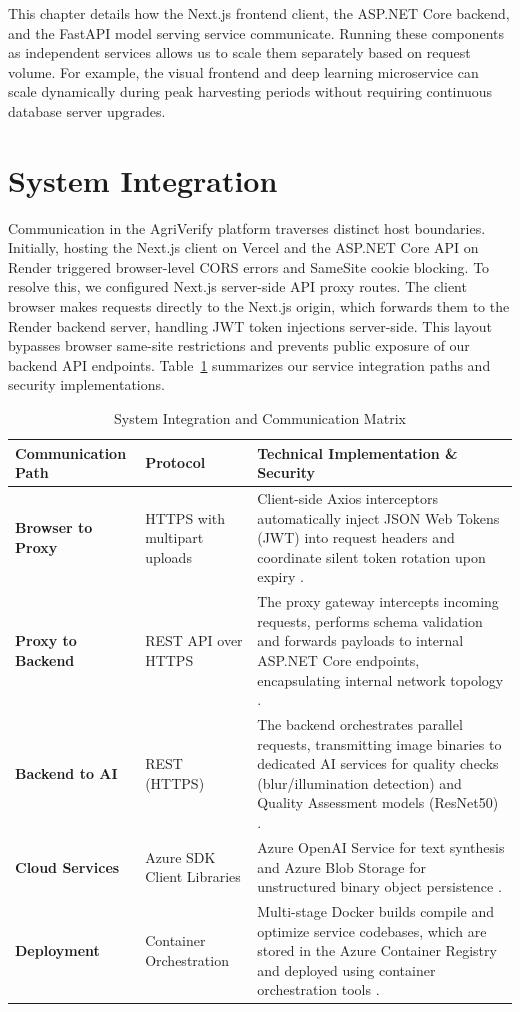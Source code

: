 This chapter details how the Next.js frontend client, the ASP.NET Core backend, and the FastAPI model serving service communicate. Running these components as independent services allows us to scale them separately based on request volume. For example, the visual frontend and deep learning microservice can scale dynamically during peak harvesting periods without requiring continuous database server upgrades.

\section{System Integration}

Communication in the AgriVerify platform traverses distinct host boundaries. Initially, hosting the Next.js client on Vercel and the ASP.NET Core API on Render triggered browser-level CORS errors and SameSite cookie blocking. To resolve this, we configured Next.js server-side API proxy routes. The client browser makes requests directly to the Next.js origin, which forwards them to the Render backend server, handling JWT token injections server-side. This layout bypasses browser same-site restrictions and prevents public exposure of our backend API endpoints. Table~\ref{tab:integration_matrix} summarizes our service integration paths and security implementations.

\begin{table}[htbp]
\centering
\caption{System Integration and Communication Matrix}
\label{tab:integration_matrix}
\small
\renewcommand{\arraystretch}{1.1}
\begin{tabularx}{\textwidth}{|p{3.5cm}|p{3.5cm}|X|}
\hline
\textbf{Communication Path} & \textbf{Protocol} & \textbf{Technical Implementation \& Security} \\
\hline
\textbf{Browser to Proxy} & HTTPS with multipart uploads & Client-side Axios interceptors automatically inject JSON Web Tokens (JWT) into request headers and coordinate silent token rotation upon expiry \cite{axios2024, jones2015jwt}. \\
\hline
\textbf{Proxy to Backend} & REST API over HTTPS & The proxy gateway intercepts incoming requests, performs schema validation and forwards payloads to internal ASP.NET Core endpoints, encapsulating internal network topology \cite{freeman2020pro}. \\
\hline
\textbf{Backend to AI} & REST (HTTPS) & The backend orchestrates parallel requests, transmitting image binaries to dedicated AI services for quality checks (blur/illumination detection) and Quality Assessment models (ResNet50) \cite{he2016deep}. \\
\hline
\textbf{Cloud Services} & Azure SDK Client Libraries & Azure OpenAI Service for text synthesis and Azure Blob Storage for unstructured binary object persistence \cite{copard2020azure}. \\
\hline
\textbf{Deployment} & Container Orchestration & Multi-stage Docker builds compile and optimize service codebases, which are stored in the Azure Container Registry and deployed using container orchestration tools \cite{merkel2014docker}. \\
\hline
\end{tabularx}
\end{table}

